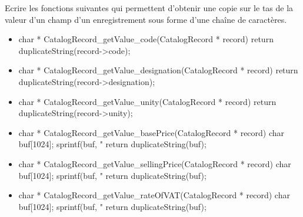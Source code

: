 Ecrire les fonctions suivantes qui permettent d'obtenir une copie sur le tas de la valeur d'un champ d'un enregistrement sous forme d'une chaîne de caractères.
\begin{itemize}
\item {}
\begin{csourcecorrection}
char * CatalogRecord_getValue_code(CatalogRecord * record) {
    return duplicateString(record->code);
}
\end{csourcecorrection}
\item {}
\begin{csourcecorrection}
char * CatalogRecord_getValue_designation(CatalogRecord * record) {
    return duplicateString(record->designation);
}
\end{csourcecorrection}
\item {}
\begin{csourcecorrection}
char * CatalogRecord_getValue_unity(CatalogRecord * record) {
    return duplicateString(record->unity);
}
\end{csourcecorrection}
\item {}
\begin{csourcecorrection}
char * CatalogRecord_getValue_basePrice(CatalogRecord * record) {
    char buf[1024];
    sprintf(buf, "%
    return duplicateString(buf);
}
\end{csourcecorrection}
\item {}
\begin{csourcecorrection}
char * CatalogRecord_getValue_sellingPrice(CatalogRecord * record) {
    char buf[1024];
    sprintf(buf, "%
    return duplicateString(buf);
}
\end{csourcecorrection}
\item {}
\begin{csourcecorrection}
char * CatalogRecord_getValue_rateOfVAT(CatalogRecord * record) {
    char buf[1024];
    sprintf(buf, "%
    return duplicateString(buf);
}
\end{csourcecorrection}
\end{itemize}


